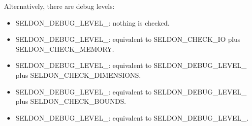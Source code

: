 \documentclass{tufte-book}
\begin{document}
\-Alternatively, there are debug levels\-:


\begin{itemize}
\item \-S\-E\-L\-D\-O\-N\-\_\-\-D\-E\-B\-U\-G\-\_\-\-L\-E\-V\-E\-L\-\_\-: nothing is checked.


\item \-S\-E\-L\-D\-O\-N\-\_\-\-D\-E\-B\-U\-G\-\_\-\-L\-E\-V\-E\-L\-\_\-: equivalent to \-S\-E\-L\-D\-O\-N\-\_\-\-C\-H\-E\-C\-K\-\_\-\-I\-O plus \-S\-E\-L\-D\-O\-N\-\_\-\-C\-H\-E\-C\-K\-\_\-\-M\-E\-M\-O\-R\-Y.


\item \-S\-E\-L\-D\-O\-N\-\_\-\-D\-E\-B\-U\-G\-\_\-\-L\-E\-V\-E\-L\-\_\-: equivalent to \-S\-E\-L\-D\-O\-N\-\_\-\-D\-E\-B\-U\-G\-\_\-\-L\-E\-V\-E\-L\-\_ plus \-S\-E\-L\-D\-O\-N\-\_\-\-C\-H\-E\-C\-K\-\_\-\-D\-I\-M\-E\-N\-S\-I\-O\-N\-S.


\item \-S\-E\-L\-D\-O\-N\-\_\-\-D\-E\-B\-U\-G\-\_\-\-L\-E\-V\-E\-L\-\_\-: equivalent to \-S\-E\-L\-D\-O\-N\-\_\-\-D\-E\-B\-U\-G\-\_\-\-L\-E\-V\-E\-L\-\_ plus \-S\-E\-L\-D\-O\-N\-\_\-\-C\-H\-E\-C\-K\-\_\-\-B\-O\-U\-N\-D\-S.


\item \-S\-E\-L\-D\-O\-N\-\_\-\-D\-E\-B\-U\-G\-\_\-\-L\-E\-V\-E\-L\-\_\-: equivalent to \-S\-E\-L\-D\-O\-N\-\_\-\-D\-E\-B\-U\-G\-\_\-\-L\-E\-V\-E\-L\-\_.


\end{itemize}
\end{document}
